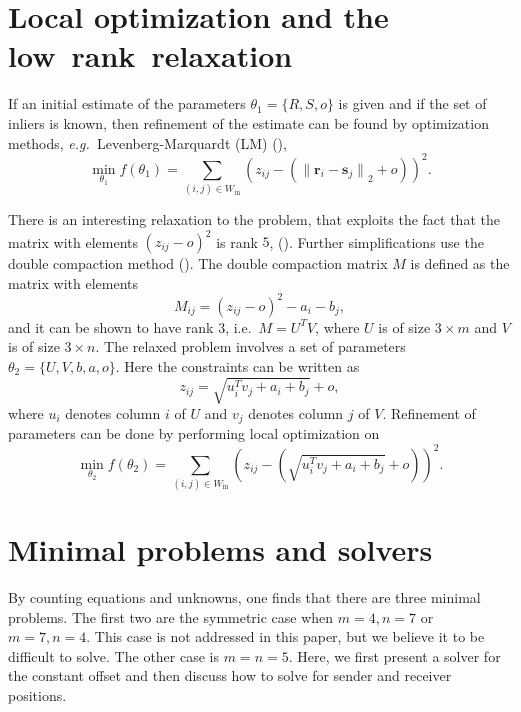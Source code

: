 \documentclass[
]{book}
\providecommand{\norm}[1]{\lVert#1\rVert}
\def\eg{\emph{e.g.\ }}
\def\Win{W_{\text{in}}}
\begin{document}
\section{Local optimization and the low~rank~relaxation}
\label{sec:rank}
\vspace{-5pt}

If an initial estimate of the parameters \(\theta_1 = \{ R, S, o \}\) is given and if the set of inliers is known, then refinement of the estimate can be found by optimization methods, \eg Levenberg-Marquardt (LM) (\cite{levenberg1944method,marquardt1963algorithm}),
\begin{equation}
\min_{\theta_1} f(\theta_1) = \sum_{(i,j) \in \Win} (z_{ij} - ( {\norm{\mathbf{r}_i - \mathbf{s}_j}}_2 +o) )^2 .
\end{equation}

There is an interesting relaxation to the problem, that exploits the fact that the matrix with elements \((z_{ij}-o)^2\) is rank \(5\), (\cite{pollefeys-nister-icassp-08}). Further simplifications use the double compaction method (\cite{kuang2013stratified}). The double compaction matrix \(M\) is defined as the matrix with elements
\begin{equation}
M_{ij}=(z_{ij}-o)^2 -a_i-b_j,
\label{eq:dc}
\end{equation}
and it can be shown to have rank \(3\), i.e.~\(M = U^T V\), where \(U\) is of size \(3 \times m\) and \(V\) is of size \(3 \times n\).
The relaxed problem involves a set of parameters
\(\theta_2 = \{ U, V, b, a, o \}\). Here the constraints can be written as
\begin{equation}
z_{ij} =  \sqrt{u_i^T v_j + a_i + b_j} + o ,
\end{equation}
where \(u_i\) denotes column \(i\) of \(U\) and \(v_j\) denotes column \(j\) of \(V\).
Refinement of parameters can be done by performing local optimization on
\begin{equation}
\min_{\theta_2} f(\theta_2) = \sum_{(i,j) \in \Win} \left ( z_{ij} - ( \sqrt{u_i^T v_j + a_i + b_j} + o ) \right )^2 .
\label{eq:relaxed}
\end{equation}

\vspace{-5pt}
\section{Minimal problems and solvers}
\label{sec:minimal}
\vspace{-5pt}

By counting equations and unknowns, one finds that there are three minimal problems. The first two are the symmetric case when \(m=4, n=7\) or \(m=7, n=4\). This case is not addressed in this paper, but we believe it to be difficult to solve. The other case is \(m=n= 5\). Here, we first present a solver for the constant offset and then discuss how to solve for sender and receiver positions.
\end{document}
